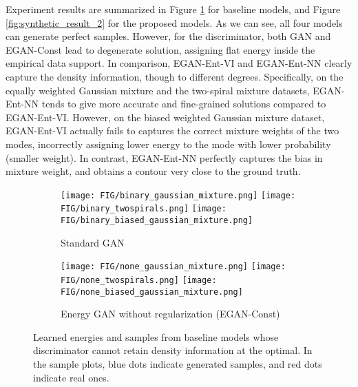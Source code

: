 \documentclass[a4paper]{article}
\begin{document}
Experiment results are summarized in Figure \ref{fig:synthetic_result_1} for baseline models, and Figure \ref{fig:synthetic_result_2} for the proposed models. 
As we can see, all four models can generate perfect samples. 
However, for the discriminator, both GAN and EGAN-Const lead to degenerate solution, assigning flat energy inside the empirical data support.
In comparison, EGAN-Ent-VI and EGAN-Ent-NN clearly capture the density information, though to different degrees.
Specifically, on the equally weighted Gaussian mixture and the two-spiral mixture datasets, EGAN-Ent-NN tends to give more accurate and fine-grained solutions compared to EGAN-Ent-VI.
However, on the biased weighted Gaussian mixture dataset, EGAN-Ent-VI actually fails to captures the correct mixture weights of the two modes, incorrectly assigning lower energy to the mode with lower probability (smaller weight).
In contrast, EGAN-Ent-NN perfectly captures the bias in mixture weight, and obtains a contour very close to the ground truth.
\begin{figure}[t!]
	\centering
	\begin{subfigure}{\textwidth}
		\texttt{[image: FIG/binary\_gaussian\_mixture.png]}
		\texttt{[image: FIG/binary\_twospirals.png]}
		\texttt{[image: FIG/binary\_biased\_gaussian\_mixture.png]}
        \caption{Standard GAN}
	\end{subfigure}
	\begin{subfigure}{\textwidth}
		\texttt{[image: FIG/none\_gaussian\_mixture.png]}
		\texttt{[image: FIG/none\_twospirals.png]}
		\texttt{[image: FIG/none\_biased\_gaussian\_mixture.png]}
        \caption{Energy GAN without regularization (EGAN-Const)}
	\end{subfigure}
    \caption{Learned energies and samples from baseline models whose discriminator cannot retain density information at the optimal. In the sample plots, blue dots indicate generated samples, and red dots indicate real ones.}
    \label{fig:synthetic_result_1}
\vspace{-0.6em}
\end{figure}
\end{document}
